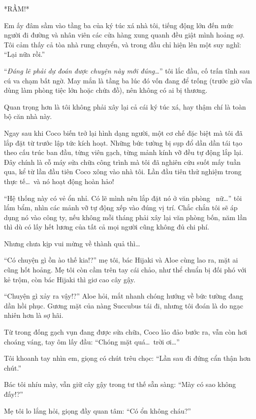 \documentclass[../main.tex]{subfiles}
\begin{document}
*RẦM!*

Em ấy đâm sầm vào tầng ba của ký túc xá nhà tôi, tiếng động lớn đến mức người đi đường và nhân viên các cửa hàng xung quanh đều giật mình hoảng sợ. Tôi cảm thấy cả tòa nhà rung chuyển, và trong đầu chỉ hiện lên một suy nghĩ: ``Lại nữa rồi.''

``\textit{Đáng lẽ phải dự đoán được chuyện này mới đúng\dots}'' tôi lắc đầu, cố trấn tĩnh sau cú va chạm bất ngờ. May mắn là tầng ba lúc đó vốn đang để trống (trước giờ vẫn dùng làm phòng tiệc lớn hoặc chứa đồ), nên không có ai bị thương.

Quan trọng hơn là tôi không phải xây lại cả cái ký túc xá, hay thậm chí là toàn bộ căn nhà này.

Ngay sau khi Coco biến trở lại hình dạng người, một cơ chế đặc biệt mà tôi đã lắp đặt từ trước lập tức kích hoạt. Những bức tường bị sụp đổ dần dần tái tạo theo cấu trúc ban đầu, từng viên gạch, từng mảnh kính vỡ đều tự động lắp lại. Đây chính là cỗ máy sửa chữa công trình mà tôi đã nghiên cứu suốt mấy tuần qua, kể từ lần đầu tiên Coco xông vào nhà tôi. Lần đầu tiên thử nghiệm trong thực tế\dots\ và nó hoạt động hoàn hảo!

``Hệ thống này có vẻ ổn nhỉ. Có lẽ mình nên lắp đặt nó ở văn phòng \hll\ nữ\dots'' tôi lẩm bẩm, nhìn các mảnh vỡ tự động xếp vào đúng vị trí. Chắc chắn tôi sẽ áp dụng nó vào công ty, nếu không mỗi tháng phải xây lại văn phòng bốn, năm lần thì dù có lấy hết lương của tất cả mọi người cũng không đủ chi phí.

Nhưng chưa kịp vui mừng về thành quả thì\dots

``Có chuyện gì ồn ào thế kia!?'' mẹ tôi, bác Hijaki và Aloe cùng lao ra, mặt ai cũng hốt hoảng. Mẹ tôi còn cầm trên tay cái chảo, như thể chuẩn bị đối phó với kẻ trộm, còn bác Hijaki thì giơ cao cây gậy.

``Chuyện gì xảy ra vậy!?'' Aloe hỏi, mắt nhanh chóng hướng về bức tường đang dần hồi phục. Gương mặt của nàng Succubus tái đi, nhưng tôi đoán là do ngạc nhiên hơn là sợ hãi.

Từ trong đống gạch vụn đang được sửa chữa, Coco lảo đảo bước ra, vẫn còn hơi choáng váng, tay ôm lấy đầu: ``Chóng mặt quá\dots\ trời ơi\dots''

Tôi khoanh tay nhìn em, giọng có chút trêu chọc: ``Lần sau đi đứng cẩn thận hơn chút.''

Bác tôi nhíu mày, vẫn giữ cây gậy trong tư thế sẵn sàng: ``Mày có sao không đấy!?''

Mẹ tôi lo lắng hỏi, giọng đầy quan tâm: ``Có ổn không cháu?''
\end{document}
